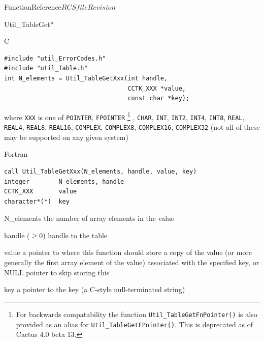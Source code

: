 \begin{cactuspart}{FunctionReference}{$RCSfile$}{$Revision$}
\begin{FunctionDescription}{Util\_TableGet*}
\begin{SynopsisSection}
\begin{Synopsis}{C}
\begin{verbatim}
#include "util_ErrorCodes.h"
#include "util_Table.h"
int N_elements = Util_TableGetXxx(int handle,
                                  CCTK_XXX *value,
                                  const char *key);
\end{verbatim}
where \verb|XXX| is one of
   \verb|POINTER|, \verb|FPOINTER|%
\footnote{%
	 For backwards compatability the function
	 {\tt Util\_TableGetFnPointer()} is also provided
	 as an alias for {\tt Util\_TableGetFPointer()}.
	 This is deprecated as of Cactus 4.0 beta 13.
	 }%
,
   \verb|CHAR|,
   \verb|INT|, \verb|INT2|, \verb|INT4|, \verb|INT8|,
   \verb|REAL|, \verb|REAL4|, \verb|REAL8|, \verb|REAL16|,
   \verb|COMPLEX|, \verb|COMPLEX8|, \verb|COMPLEX16|, \verb|COMPLEX32|
(not all of these may be supported on any given system)
\end{Synopsis}
\begin{Synopsis}{Fortran}
\begin{verbatim}
call Util_TableGetXxx(N_elements, handle, value, key)
integer        N_elements, handle
CCTK_XXX       value
character*(*)  key
\end{verbatim}
\end{Synopsis}
\end{SynopsisSection}

\begin{ResultSection}
\begin{Result}{N\_elements}
the number of array elements in the value
\end{Result}
\end{ResultSection}

\begin{ParameterSection}
\begin{Parameter}{handle ($\ge 0$)}
handle to the table
\end{Parameter}
\begin{Parameter}{value}
a pointer to where this function should store a copy of the value
(or more generally the first array element of the value) associated
with the specified key,
or NULL pointer to skip storing this
\end{Parameter}
\begin{Parameter}{key}
a pointer to the key (a C-style null-terminated string)
\end{Parameter}
\end{ParameterSection}


\end{FunctionDescription}
\end{cactuspart}

